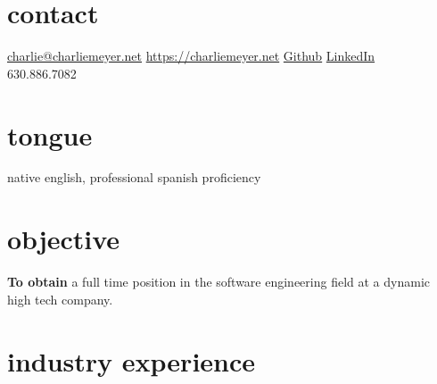 \documentclass{friggeri-cv} %
\begin{document}


\begin{aside} %
\section{contact}
\href{mailto:charlie@charliemeyer.net}{charlie@charliemeyer.net}
\href{https://charliemeyer.net}{https://charliemeyer.net}
\href{https://www.github.com/cemeyer2}{Github}
\href{www.linkedin.com/in/cemeyer2}{LinkedIn}
~
630.886.7082
~
\section{tongue}
native english,
professional spanish proficiency
\end{aside}

\section{objective}

\textbf{To obtain} a full time position in the software engineering field at a dynamic high tech company.

\section{industry experience}
\end{document}
